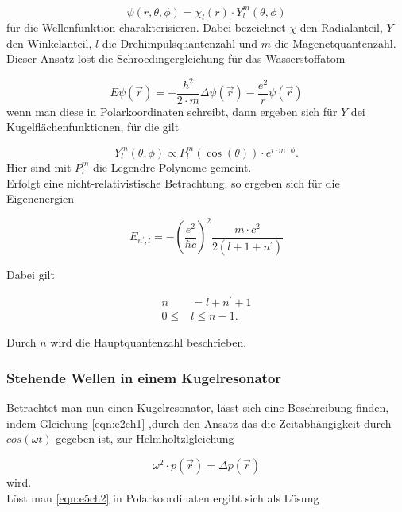 \begin{equation}
  \label{eqn:e1ch2}
  \psi(r,\theta,\phi) = \chi_{l}(r) \cdot Y_{l}^{m}(\theta, \phi)
\end{equation}
für die Wellenfunktion charakterisieren. Dabei bezeichnet $\chi$ den Radialanteil, $Y$ den Winkelanteil, $l$
die Drehimpulsquantenzahl und $m$ die Magenetquantenzahl. Dieser Ansatz löst die Schroedingergleichung für
das Wasserstoffatom

\begin{equation}
  \label{eqn:e2ch2}
  E \psi(\vec r) = - \frac{\hbar^2}{2\cdot m} \Delta  \psi(\vec r) - \frac{e^2}{r} \psi(\vec r)
\end{equation}
wenn man diese in Polarkoordinaten schreibt, dann ergeben sich für $Y$ dei Kugelflächenfunktionen, für die gilt


\begin{equation}
  \label{eqn:e3ch2}
  Y_{l}^{m}(\theta, \phi) \propto P_{l}^{m}(\cos(\theta)) \cdot e^{i\cdot m \cdot \phi}.
\end{equation}
Hier sind mit $P_{l}^{m}$ die Legendre-Polynome gemeint.\\
Erfolgt eine nicht-relativistische Betrachtung, so ergeben sich für die Eigenenergien

\begin{equation}
  \label{eqn:e4ch2}
  E_{n^{'}, l} = -\left( \frac{e^2}{\hbar c} \right)^2 \frac{m \cdot c^2}{2\left(l + 1 + n^{'} \right)}
\end{equation}

Dabei gilt


\begin{align}
  n &= l + n^{'} + 1\\
  0 \leq & l \leq n - 1.
\end{align}

Durch $n$ wird die Hauptquantenzahl beschrieben.


\subsubsection{Stehende Wellen in einem Kugelresonator}
\label{subsubsec:tch22}
Betrachtet man nun einen Kugelresonator, lässt sich eine Beschreibung finden, indem Gleichung
\eqref{eqn:e2ch1} ,durch den Ansatz das die Zeitabhängigkeit durch $cos(\omega t )$ gegeben ist, zur
Helmholtzlgleichung

\begin{equation}
  \label{eqn:e5ch2}
  \omega^2 \cdot p(\vec r) = \Delta  p(\vec r)
\end{equation}
wird.\\
Löst man \eqref{eqn:e5ch2} in Polarkoordinaten ergibt sich als Lösung

